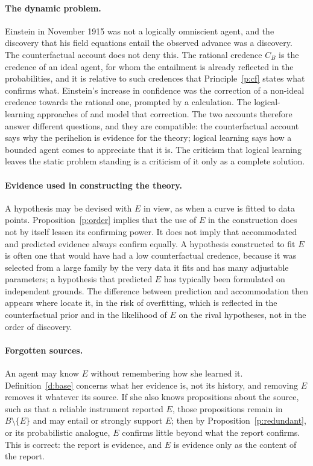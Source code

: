 \documentclass{situationist-preprint}
\begin{document}
\paragraph{The dynamic problem.} Einstein in November 1915 was not a logically omniscient agent, and the discovery that his field equations entail the observed advance was a discovery. The counterfactual account does not deny this. The rational credence $C_B$ is the credence of an ideal agent, for whom the entailment is already reflected in the probabilities, and it is relative to such credences that Principle~\ref{p:cf} states what confirms what. Einstein's increase in confidence was the correction of a non-ideal credence towards the rational one, prompted by a calculation. The logical-learning approaches of \citet{Garber1983} and \citet{Jeffrey1983} model that correction. The two accounts therefore answer different questions, and they are compatible: the counterfactual account says why the perihelion is evidence for the theory; logical learning says how a bounded agent comes to appreciate that it is. The criticism that logical learning leaves the static problem standing is a criticism of it only as a complete solution.

\paragraph{Evidence used in constructing the theory.} A hypothesis may be devised with $E$ in view, as when a curve is fitted to data points. Proposition~\ref{p:order} implies that the use of $E$ in the construction does not by itself lessen its confirming power. It does not imply that accommodated and predicted evidence always confirm equally. A hypothesis constructed to fit $E$ is often one that would have had a low counterfactual credence, because it was selected from a large family by the very data it fits and has many adjustable parameters; a hypothesis that predicted $E$ has typically been formulated on independent grounds. The difference between prediction and accommodation then appears where \citet{HitchcockSober2004} locate it, in the risk of overfitting, which is reflected in the counterfactual prior and in the likelihood of $E$ on the rival hypotheses, not in the order of discovery.

\paragraph{Forgotten sources.} An agent may know $E$ without remembering how she learned it. Definition~\ref{d:base} concerns what her evidence is, not its history, and removing $E$ removes it whatever its source. If she also knows propositions about the source, such as that a reliable instrument reported $E$, those propositions remain in $B \setminus \{E\}$ and may entail or strongly support $E$; then by Proposition~\ref{p:redundant}, or its probabilistic analogue, $E$ confirms little beyond what the report confirms. This is correct: the report is evidence, and $E$ is evidence only as the content of the report.
\end{document}
